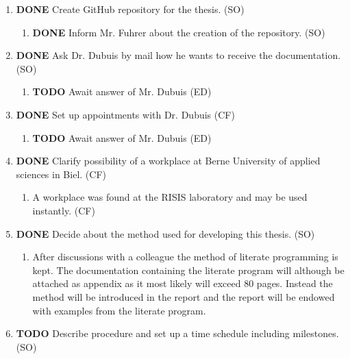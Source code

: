 \documentclass[10pt, openright, notitlepage]{scrreprt}
\begin{document}
\begin{enumerate}
\item {\bfseries\sffamily DONE} Create GitHub repository for the thesis. (SO)
\label{sec:orga192737}
\begin{enumerate}
\item {\bfseries\sffamily DONE} Inform Mr. Fuhrer about the creation of the repository. (SO)
\label{sec:org1e1c202}
\end{enumerate}

\item {\bfseries\sffamily DONE} Ask Dr. Dubuis by mail how he wants to receive the documentation. (SO)
\label{sec:orgb2dac62}
\begin{enumerate}
\item {\bfseries\sffamily TODO} Await answer of Mr. Dubuis (ED)
\label{sec:org0ac7d38}
\end{enumerate}

\item {\bfseries\sffamily DONE} Set up appointments with Dr. Dubuis (CF)
\label{sec:org9701bcf}
\begin{enumerate}
\item {\bfseries\sffamily TODO} Await answer of Mr. Dubuis (ED)
\label{sec:orgc39741c}
\end{enumerate}

\item {\bfseries\sffamily DONE} Clarify possibility of a workplace at Berne University of applied sciences in Biel. (CF)
\label{sec:orged7716c}
\begin{enumerate}
\item A workplace was found at the RISIS laboratory and may be used instantly. (CF)
\label{sec:orge60a5f6}
\end{enumerate}

\item {\bfseries\sffamily DONE} Decide about the method used for developing this thesis. (SO)
\label{sec:orgc540eae}
\begin{enumerate}
\item After discussions with a colleague the method of literate programming is
\label{sec:org89e8ed6}
kept. The documentation containing the literate program will although be
attached as appendix as it most likely will exceed 80 pages. Instead the
method will be introduced in the report and the report will be endowed
with examples from the literate program.
\end{enumerate}

\item {\bfseries\sffamily TODO} Describe procedure and set up a time schedule including milestones. (SO)
\label{sec:orgf224fdb}
\end{enumerate}
\end{document}
